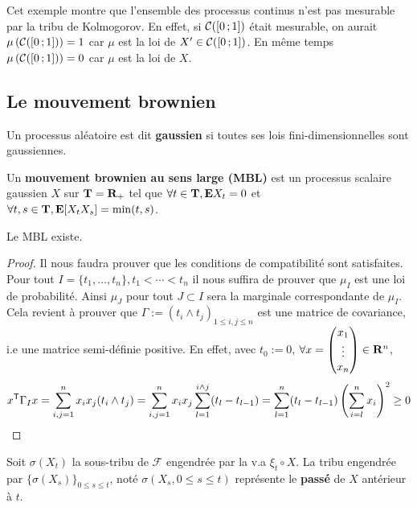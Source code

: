 	Cet exemple montre que l'ensemble des processus continus n'est pas mesurable par la tribu de Kolmogorov.
	En effet, si $\mathcal{C}(\mathopen{[}0\mathclose{}\mathpunct{};1\mathclose{]})$ était mesurable, on aurait $\mu \left( \mathcal{C}(\mathopen{[}0\mathclose{}\mathpunct{};1\mathclose{]}) \right) = 1$ car $\mu$ est la loi de $X' \in \mathcal{C}(\mathopen{[}0\mathclose{}\mathpunct{};1\mathclose{]})$.
	En même temps $\mu \left( \mathcal{C}(\mathopen{[}0\mathclose{}\mathpunct{};1\mathclose{]}) \right) = 0$ car $\mu$ est la loi de $X$.


\subsection{Le mouvement brownien}

	\begin{defn}
		Un processus aléatoire est dit \textbf{gaussien} si toutes ses lois fini-dimensionnelles sont gaussiennes.
	\end{defn}
	
	\begin{defn}
		Un \textbf{mouvement brownien au sens large (MBL)} est un processus scalaire gaussien $X$ sur $\mathbf{T} = \mathbf{R}_+$ tel que $\forall t \in \mathbf{T}, \mathbf{E} X_t = 0$ et $\forall t,s \in \mathbf{T}, \mathbf{E}[X_t X_s] = \min(t,s)$.
	\end{defn}
	
	\begin{pop}
		Le MBL existe.
	\end{pop}
	
	\begin{proof}
		Il nous faudra prouver que les conditions de compatibilité sont satisfaites.
		Pour tout $I = \{ t_1,\ldots,t_n \}, t_1 < \cdots < t_n$ il nous suffira de prouver que $\mu_I$ est une loi de probabilité.
		Ainsi $\mu_J$ pour tout $J \subset I$ sera la marginale correspondante de $\mu_I$.
		Cela revient à prouver que $\Gamma := (t_i \wedge t_j)_{1 \leq i,j \leq n}$ est une matrice de covariance, i.e une matrice semi-définie positive.
		En effet, avec $t_0 := 0$, $\forall x = \begin{pmatrix} x_1 \\ \vdots \\ x_n \end{pmatrix} \in \mathbf{R}^n$,
		$$x^\mathsf{T} \Gamma_I x = \sum_{i,j = 1}^n x_i x_j (t_i \wedge t_j)
		                        = \sum_{i,j = 1}^n x_i x_j \sum_{l = 1}^{i \wedge j} (t_l - t_{l - 1})
		                        = \sum_{l = 1}^n (t_l - t_{l - 1}) \left( \sum_{i = l}^n x_i \right)^2
		                        \geq 0$$
	\end{proof}
	
	\begin{defn}
		Soit $\sigma(X_t)$ la sous-tribu de $\mathcal{F}$ engendrée par la v.a $\xi_t \circ X$.
		La tribu engendrée par $\{ \sigma(X_s) \}_{0 \leq s \leq t}$, noté $\sigma(X_s, 0 \leq s \leq t)$ représente le \textbf{passé} de $X$ antérieur à $t$.
	\end{defn}
	
